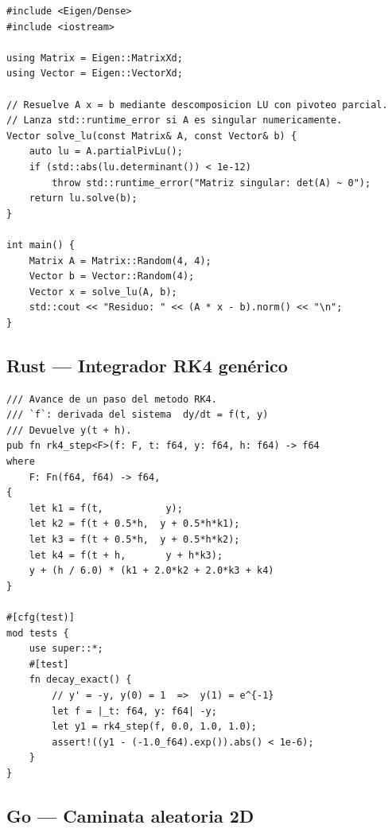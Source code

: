 \begin{lstlisting}[style=cpp,
  caption={Factorización LU parcialmente pivotada con Eigen},
  label={lst:lu-cpp}]
#include <Eigen/Dense>
#include <iostream>

using Matrix = Eigen::MatrixXd;
using Vector = Eigen::VectorXd;

// Resuelve A x = b mediante descomposicion LU con pivoteo parcial.
// Lanza std::runtime_error si A es singular numericamente.
Vector solve_lu(const Matrix& A, const Vector& b) {
    auto lu = A.partialPivLu();
    if (std::abs(lu.determinant()) < 1e-12)
        throw std::runtime_error("Matriz singular: det(A) ~ 0");
    return lu.solve(b);
}

int main() {
    Matrix A = Matrix::Random(4, 4);
    Vector b = Vector::Random(4);
    Vector x = solve_lu(A, b);
    std::cout << "Residuo: " << (A * x - b).norm() << "\n";
}
\end{lstlisting}

\subsection{Rust — Integrador RK4 genérico}
\label{subsec:rust}

\begin{lstlisting}[style=rust,
  caption={Runge-Kutta de orden 4 genérico sobre \texttt{f64}},
  label={lst:rk4-rust}]
/// Avance de un paso del metodo RK4.
/// `f`: derivada del sistema  dy/dt = f(t, y)
/// Devuelve y(t + h).
pub fn rk4_step<F>(f: F, t: f64, y: f64, h: f64) -> f64
where
    F: Fn(f64, f64) -> f64,
{
    let k1 = f(t,           y);
    let k2 = f(t + 0.5*h,  y + 0.5*h*k1);
    let k3 = f(t + 0.5*h,  y + 0.5*h*k2);
    let k4 = f(t + h,       y + h*k3);
    y + (h / 6.0) * (k1 + 2.0*k2 + 2.0*k3 + k4)
}

#[cfg(test)]
mod tests {
    use super::*;
    #[test]
    fn decay_exact() {
        // y' = -y, y(0) = 1  =>  y(1) = e^{-1}
        let f = |_t: f64, y: f64| -y;
        let y1 = rk4_step(f, 0.0, 1.0, 1.0);
        assert!((y1 - (-1.0_f64).exp()).abs() < 1e-6);
    }
}
\end{lstlisting}

\subsection{Go — Caminata aleatoria 2D}
\label{subsec:go}

